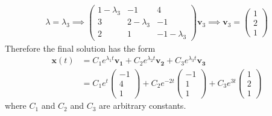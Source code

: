 \documentclass[12pt]{article}
\begin{document}
 \begin{align*}
        \lambda = \lambda_3
        \implies
        \begin{pmatrix}
                1 - \lambda_3 & -1            & 4              \\
                3             & 2 - \lambda_3 & -1             \\
                2             & 1             & -1 - \lambda_3
        \end{pmatrix} \mathbf{v}_3
        \implies
        \mathbf{v}_3 =
        \begin{pmatrix}
                1 \\ 2 \\ 1
        \end{pmatrix}
\end{align*}
Therefore the final solution has the form
\begin{align*}
        \mathbf{x}(t) & = C_1 e^{\lambda_1 t} \mathbf{v_1} + C_2 e^{\lambda_2 t} \mathbf{v_2} + C_3 e^{\lambda_3 t} \mathbf{v_3}\\
                   & = C_1 e^{t} \begin{pmatrix}
                -1 \\ 4 \\ 1
        \end{pmatrix}
        + C_2 e^{-2t} \begin{pmatrix}
                -1 \\ 1 \\ 1
        \end{pmatrix}
        + C_3 e^{3t} \begin{pmatrix}
                1 \\ 2 \\ 1
        \end{pmatrix}
\end{align*}
where \(C_1\) and \(C_2\) and \(C_3\) are arbitrary constants.
\end{document}
